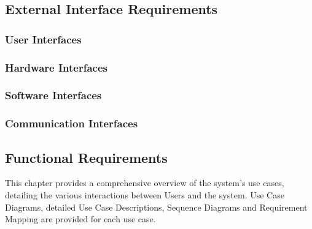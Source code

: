 \subsection{External Interface Requirements}
\subsubsection{User Interfaces}
\subsubsection{Hardware Interfaces}
\subsubsection{Software Interfaces}
\subsubsection{Communication Interfaces}
\subsection{Functional Requirements}
This chapter provides a comprehensive overview of the system's use cases, detailing the various interactions between Users and the system.
Use Case Diagrams, detailed Use Case Descriptions, Sequence Diagrams and Requirement Mapping are provided for each use case.
